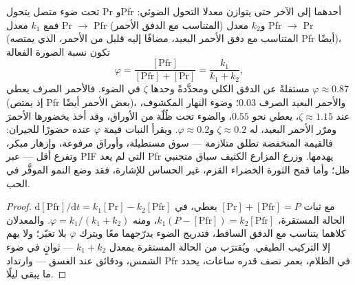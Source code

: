 \begin{proposition}\label{prop:b3:plant-molecular-physiology:photoequilibrium}
تحت ضوء متصل يتحول Pr وPfr أحدهما إلى الآخر حتى يتوازن معدلا
التحول الضوئي: فمع $k_{1}$ معدل Pr $\to$ Pfr
(المتناسب مع الدفق الأحمر) و$k_{2}$ معدل Pfr $\to$ Pr
(المتناسب مع دفق الأحمر البعيد، مضافًا إليه قليل من الأحمر،
الذي يمتصه Pfr أيضًا)، تكون نسبة الصورة الفعالة
\[
\varphi = \frac{[\text{Pfr}]}{[\text{Pfr}] + [\text{Pr}]} = \frac{k_{1}}{k_{1} + k_{2}},
\]
مستقلةً عن الدفق الكلي ومحدَّدةً وحدها \emph{} $\zeta$ في الضوء. فالأحمر الصرف يعطي $\varphi \approx 0.87$ (إذ
يمتص Pfr بعض الأحمر أيضًا)، والأحمر البعيد الصرف $0.03$؛ وضوء
النهار المكشوف، عند $\zeta \approx
1.15$، يعطي نحو $0.55$، والضوء تحت ظُلّة من الأوراق، وقد أخذ
يخضورها الأحمرَ ومرّر الأحمر البعيد، له
$\zeta \approx 0.2$ و$\varphi \approx 0.2$. ويقرأ النبات
قيمة $\varphi$ عنده حضورًا للجيران: فالقيمة المنخفضة تطلق
متلازمة \emph{} --- سوق مستطيلة، وأوراق مرفوعة،
وإزهار مبكر، وتفرع أقل --- عبر PIF التي لم يعد Pfr يهدمها.
وزرع المزارع الكثيف سباق متجنبي ظل؛ وأما قمح الثورة الخضراء
القزم، غير الحساس للإشارة، فقد وضع النمو الموفَّر في الحب.
\end{proposition}
\begin{proof}
$\mathrm{d}[\text{Pfr}]/\mathrm{d}t = k_{1}[\text{Pr}] - k_{2}[\text{Pfr}]$
مع ثبات $[\text{Pr}] + [\text{Pfr}] = P$ يعطي، في الحالة المستقرة،
$k_{1}(P - [\text{Pfr}]) = k_{2}[\text{Pfr}]$، ومنه $\varphi = k_{1}/
(k_{1} + k_{2})$. والمعدلان كلاهما يتناسب مع الدفق الساقط، فتدريج
الضوء يدرّجهما معًا ويترك $\varphi$ بلا تغيّر؛ ولا يهم إلا
التركيب الطيفي. ويُقترَب من الحالة المستقرة بمعدل
$k_{1} + k_{2}$ --- ثوانٍ في ضوء الشمس، ودقائق عند الغسق ---
وارتداد Pfr في الظلام، بعمر نصف قدره ساعات، يحدد ما يبقى
ليلًا.
\end{proof}

